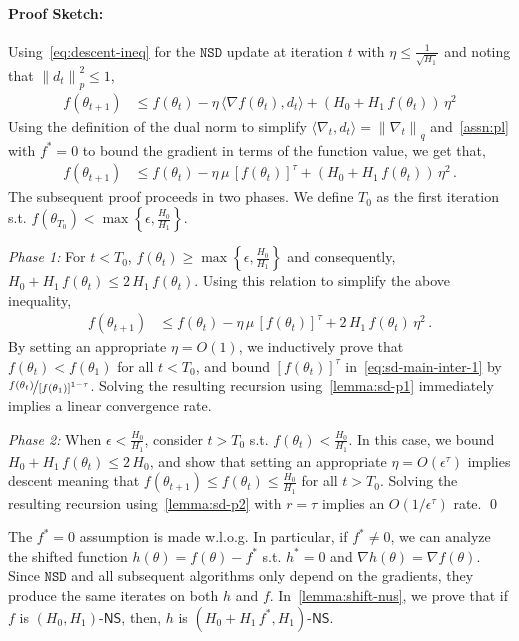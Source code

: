 \documentclass{article}
\newcommand{\normsq}[1]{\left\|#1 \right\|^{2}}
\newcommand{\norm}[1]{\left\|#1 \right\|}
\newcommand{\tht}{\theta_t}
\newcommand{\thtt}{\theta_{t+1}}
\newcommand{\NSD}{\texttt{NSD}}
\newcommand{\NS}{\textsf{NS}}
\begin{document}
\paragraph{Proof Sketch:} Using~\cref{eq:descent-ineq} for the $\NSD$ update at iteration $t$ with $\eta \leq \frac{1}{\sqrt{H_1}}$ and noting that $\normsq{d_t}_p \leq 1$, 
\begin{align}
f(\thtt) & \leq f(\tht) - \eta \,  \langle \nabla f(\tht), d_t \rangle + \left(H_0 + H_1 \, f(\tht) \right) \, \eta^2 \nonumber
\end{align}
Using the definition of the dual norm to simplify $\langle \nabla_t, d_t \rangle = \norm{\nabla_t}_q$ and~\cref{assn:pl} with $f^* = 0$ to bound the gradient in terms of the function value, we get that,
\begin{align}
f(\thtt) & \leq f(\tht) - \eta \,  \mu \, [f(\tht)]^\tau +\left(H_0 + H_1 \, f(\tht) \right) \, \eta^2 \,.    \nonumber
\end{align}
The subsequent proof proceeds in two phases. We define $T_0$ as the first iteration s.t. $f(\theta_{T_0}) < \max\left\{\epsilon, \frac{H_0}{H_1} \right\}$. 

\textit{Phase 1:} For $t < T_0$, $f(\tht) \geq \max\left\{\epsilon, \frac{H_0}{H_1} \right\}$ and consequently, $H_0 + H_1 \, f(\tht) \leq 2 \, H_1 \, f(\tht)$. Using this relation to simplify the above inequality, 
\begin{align}
f(\thtt) & \leq f(\tht) - \eta \,  \mu \, [f(\tht)]^\tau + 2 \, H_1 \, f(\tht) \, \eta^2 \,.   
\label{eq:sd-main-inter-1}
\end{align}
By setting an appropriate $\eta = O(1)$, we inductively prove that $f(\tht) < f(\theta_1)$ for all $t < T_0$, and bound $[f(\tht)]^\tau$ in~\cref{eq:sd-main-inter-1} by $\nicefrac{f(\tht)}{[f(\theta_1)]^{1 - \tau}}$. Solving the resulting recursion using~\cref{lemma:sd-p1} immediately implies a linear convergence rate. 

\textit{Phase 2:} When $\epsilon < \frac{H_0}{H_1}$, consider $t > T_0$ s.t. $f(\tht) < \frac{H_0}{H_1}$. In this case, we bound $H_0 + H_1 \, f(\tht) \leq 2 \, H_0$, and show that setting an appropriate  $\eta = O(\epsilon^\tau)$ implies descent meaning that $f(\thtt) \leq f(\tht) \leq \frac{H_0}{H_1}$ for all $t > T_0$. Solving the resulting recursion using~\cref{lemma:sd-p2} with $r = \tau$ implies an $O(1/\epsilon^\tau)$ rate. \qed 

\begin{remark}
The $f^* = 0$ assumption is made w.l.o.g. In particular, if $f^* \neq 0$, we can analyze the shifted function $h(\theta) = f(\theta) - f^*$ s.t. $h^* = 0$ and $\nabla h(\theta) = \nabla f(\theta)$. Since $\NSD$ and all subsequent algorithms only depend on the gradients, they produce the same iterates on both $h$ and $f$. In~\cref{lemma:shift-nus}, we prove that if $f$ is $(H_0, H_1)$-$\NS$, then, $h$ is $(H_0 + H_1 \, f^*, H_1)$-$\NS$. 
\end{remark}
\end{document}
